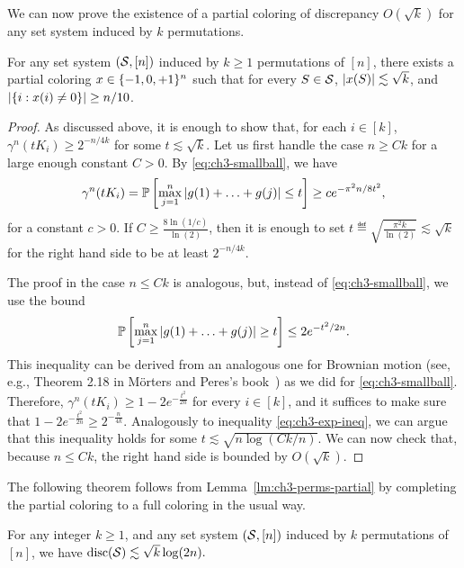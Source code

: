 We can now prove the existence of a partial
coloring of discrepancy \(O(\sqrt{k})\) for any set system induced by
\(k\) permutations.

\begin{lemma}\label{lm:ch3-perms-partial}
  For any set system \((\mathcal{S},[n])\)
  induced by \(k\geq 1\) permutations of \([n]\), there exists a partial
  coloring \(x \in \{-1, 0,+1\}^n\) such that for every
  \(S \in \mathcal{S}\), \(|x(S)| \lesssim \sqrt{k}\), and
  \(|\{i: x(i) \neq 0\}| \ge n/10\).
\end{lemma}
\begin{proof}
  As discussed above, it is enough to show that, for each
  \(i \in [k]\), \(\gamma^n(tK_i) \ge 2^{-n/4k}\) for some
  \(t \lesssim \sqrt{k}\). Let us first handle the case $n \ge Ck$ for
  a large enough constant $C>0$. By \eqref{eq:ch3-smallball}, we
  have
  \[
    \gamma^n(tK_i) =
    \mathbb{P}\left[\max_{j = 1}^n\left|g(1) + \ldots +  g(j)\right|  \le t\right]
    \ge c e^{-\pi^2n/8t^2},
  \]
  for a constant \(c > 0\). If $C \ge \frac{8\ln(1/c)}{\ln(2)}$, then
  it is enough to set $t \eqdef \sqrt{\frac{\pi^2 k}{\ln(2)}} \lesssim
  \sqrt{k}$ for the right hand side to be at least
  $2^{-n/4k}$.

  The proof in the case $n \le Ck$ is analogous, but, instead of
  \eqref{eq:ch3-smallball}, we use the bound
  \begin{equation}
    \label{eq:ch3-rw-tail}
    \mathbb{P}\left[\max_{j = 1}^n\left|g(1) + \ldots + g(j)\right|  \ge t\right]
    \le
    2e^{-t^2/2n}.    
  \end{equation}
  This inequality can be derived from an analogous one for Brownian
  motion (see, e.g., Theorem 2.18 in M\"{o}rters and
  Peres's book~\cite{PeresMorters}) as we did for
  \eqref{eq:ch3-smallball}. Therefore, $\gamma^n(tK_i) \ge 1- 2
  e^{-\frac{t^2}{2n}}$ for every $i \in [k]$, and  it suffices to make sure that
  \(
  1- 2e^{-\frac{t^2}{2n}} \ge 2^{-\frac{n}{4k}}.
  \) %
    Analogously to inequality \eqref{eq:ch3-exp-ineq}, we can argue that this inequality holds
  for some $t \lesssim \sqrt{n\log\left({Ck}/{n}\right)}$. We can
  now check that, because $n \le Ck$, the right hand side is bounded
  by $O(\sqrt{k})$.
\end{proof}

The following theorem follows from Lemma~\ref{lm:ch3-perms-partial} by
completing the partial coloring to a full coloring in the usual way. 
\begin{theorem}\label{thm:ch3-perms}
  For any integer \(k \ge 1\), and any set system \((\mathcal{S},[n])\)
  induced by \(k\) permutations of \([n]\), we have
  \(\operatorname{disc}(\mathcal{S}) \lesssim \sqrt{k}\log(2n).\)
\end{theorem}

